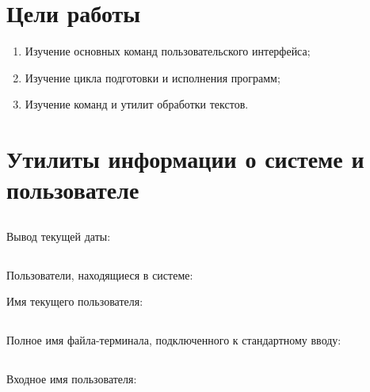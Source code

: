 





\tableofcontents
\newpage

\section{Цели работы}

\begin{enumerate}
	\item Изучение основных команд пользовательского интерфейса;
	\item Изучение цикла подготовки и исполнения программ;
	\item Изучение команд и утилит обработки текстов.
\end{enumerate}

\section{Утилиты информации о системе и пользователе}

\subsection{}

Вывод текущей даты:


\subsection{}

Пользователи, находящиеся в системе:


Имя текущего пользователя:


\subsection{}

Полное имя файла-терминала, подключенного к стандартному вводу:


\subsection{}

Входное имя пользователя:


